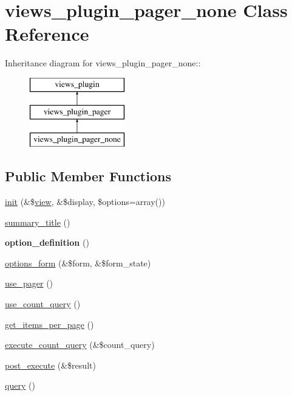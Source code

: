 \hypertarget{classviews__plugin__pager__none}{
\section{views\_\-plugin\_\-pager\_\-none Class Reference}
\label{classviews__plugin__pager__none}
}
Inheritance diagram for views\_\-plugin\_\-pager\_\-none::\begin{figure}[H]
\begin{center}
\leavevmode
\includegraphics[height=3cm]{classviews__plugin__pager__none}
\end{center}
\end{figure}
\subsection*{Public Member Functions}
\begin{DoxyCompactItemize}
\item 
\hyperlink{classviews__plugin__pager__none_a7d293fbd8b7b2a526c916ffd0bccc33a}{init} (\&\$\hyperlink{classview}{view}, \&\$display, \$options=array())
\item 
\hyperlink{classviews__plugin__pager__none_abf1170948c1653a9b6e8d4c92273060b}{summary\_\-title} ()
\item 
\hypertarget{classviews__plugin__pager__none_ae2b19eb701dd7c10fee4bd2b0ed16fd0}{
{\bfseries option\_\-definition} ()}
\label{classviews__plugin__pager__none_ae2b19eb701dd7c10fee4bd2b0ed16fd0}

\item 
\hyperlink{classviews__plugin__pager__none_adf238119a304288014fc66ae089a119a}{options\_\-form} (\&\$form, \&\$form\_\-state)
\item 
\hyperlink{classviews__plugin__pager__none_a60e31c5b5a026cf9ce14d6d8664c4407}{use\_\-pager} ()
\item 
\hyperlink{classviews__plugin__pager__none_a2a4be240474e0db5577ff4f8b7364b15}{use\_\-count\_\-query} ()
\item 
\hyperlink{classviews__plugin__pager__none_adbd6fa6434d0708b1e7dd49ff4e9f1d0}{get\_\-items\_\-per\_\-page} ()
\item 
\hyperlink{classviews__plugin__pager__none_a7bcc11b430579941eadc1a797da2eda0}{execute\_\-count\_\-query} (\&\$count\_\-query)
\item 
\hyperlink{classviews__plugin__pager__none_a6edc35744edc03c632d74267a4d33ad3}{post\_\-execute} (\&\$result)
\item 
\hyperlink{classviews__plugin__pager__none_a16102d30cc1402cb7ed28fba9606cf81}{query} ()
\end{DoxyCompactItemize}


